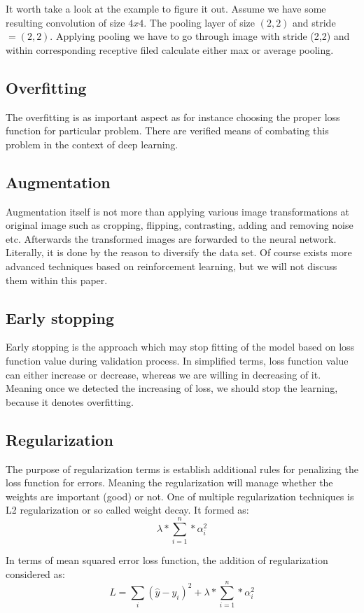 It worth take a look at the example to figure it out. Assume we have some resulting convolution of size $4x4$. The pooling layer of size $(2, 2)$ and stride $ = (2, 2)$. 
Applying pooling we have to go through image with stride (2,2) and within corresponding receptive filed calculate either max or average pooling.  

\subsection{Overfitting}
The overfitting is as important aspect as for instance choosing the proper loss function for particular problem. There are verified means of combating this problem in the context of deep learning.   

\subsection{Augmentation}
Augmentation itself is not more than applying various image transformations at original image such as cropping, flipping, contrasting, adding and removing noise etc. Afterwards the transformed images are forwarded to the neural network. Literally, it is done by the reason to diversify the data set. Of course exists more advanced techniques based on reinforcement learning, but we will not discuss them within this paper.      

\subsection{Early stopping}
Early stopping is the approach which may stop fitting of the model based on loss function value during validation process. In simplified terms, loss function value can either increase or decrease, whereas we are willing in decreasing of it. Meaning once we detected the increasing of loss, we should stop the learning, because it denotes overfitting.      

\subsection{Regularization}
The purpose of regularization terms is establish additional rules for penalizing the loss function for errors. Meaning the regularization will manage whether the weights are important (good) or not. One of multiple regularization techniques is L2 regularization or so called weight decay. It formed as:
\[ \lambda*\sum_{i=1}^{n}*\alpha_i^2 \]

In terms of mean squared error loss function, the addition of regularization considered as:
\[ L = \sum_{i}(\hat{y}-y_i)^2 + \lambda*\sum_{i=1}^{n}*\alpha_i^2\]

